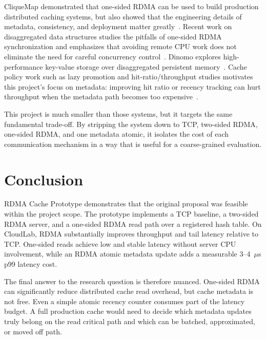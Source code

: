 \documentclass[letterpaper,twocolumn,10pt]{article}
\newcommand{\sys}{RDMA Cache Prototype}
\begin{document}
CliqueMap demonstrated that one-sided RDMA can be used to build production
distributed caching systems, but also showed that the engineering details of
metadata, consistency, and deployment matter greatly~\cite{singhvi21cliquemap}.
Recent work on disaggregated data structures studies the pitfalls of
one-sided RDMA synchronization and emphasizes that avoiding remote CPU work
does not eliminate the need for careful concurrency control~\cite{jasny25rdma}.
Dinomo explores high-performance key-value storage over disaggregated
persistent memory~\cite{lee22dinomo}.  Cache policy work such as lazy
promotion and hit-ratio/throughput studies motivates this project's focus on
metadata: improving hit ratio or recency tracking can hurt throughput when the
metadata path becomes too expensive~\cite{chenLazyPromotion,qiu24hitratio}.

This project is much smaller than those systems, but it targets the same
fundamental trade-off.  By stripping the system down to TCP, two-sided RDMA,
one-sided RDMA, and one metadata atomic, it isolates the cost of each
communication mechanism in a way that is useful for a coarse-grained evaluation.

\section{Conclusion}

\sys{} demonstrates that the original proposal was feasible within the project
scope.  The prototype implements a TCP baseline, a two-sided RDMA server, and
a one-sided RDMA read path over a registered hash table.  On CloudLab, RDMA
substantially improves throughput and tail latency relative to TCP.  One-sided
reads achieve low and stable latency without server CPU involvement, while an
RDMA atomic metadata update adds a measurable 3--4~$\mu$s p99 latency cost.

The final answer to the research question is therefore nuanced.  One-sided
RDMA can significantly reduce distributed cache read overhead, but cache
metadata is not free.  Even a simple atomic recency counter consumes part of
the latency budget.  A full production cache would need to decide which
metadata updates truly belong on the read critical path and which can be
batched, approximated, or moved off path.

\end{document}
